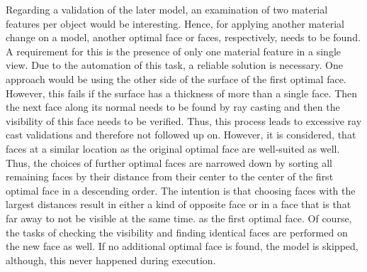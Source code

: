 Regarding a validation of the later model, an examination of two material features per object would be interesting.
Hence, for applying another material change on a model, another optimal face or faces, respectively, needs to be found.
A requirement for this is the presence of only one material feature in a single view.
Due to the automation of this task, a reliable solution is necessary.
One approach would be using the other side of the surface of the first optimal face.
However, this fails if the surface has a thickness of more than a single face.
Then the next face along its normal needs to be found by ray casting and then the visibility of this face needs to be verified.
Thus, this process leads to excessive ray cast validations and therefore not followed up on.
However, it is considered, that faces at a similar location as the original optimal face are well-suited as well.
Thus, the choices of further optimal faces are narrowed down by sorting all remaining faces by their distance from their center to the center of the first optimal face in a descending order.
The intention is that choosing faces with the largest distances result in either a kind of opposite face or in a face that is that far away to not be visible at the same time. as the first optimal face.
Of course, the tasks of checking the visibility and finding identical faces are performed on the new face as well.
If no additional optimal face is found, the model is skipped, although, this never happened during execution.